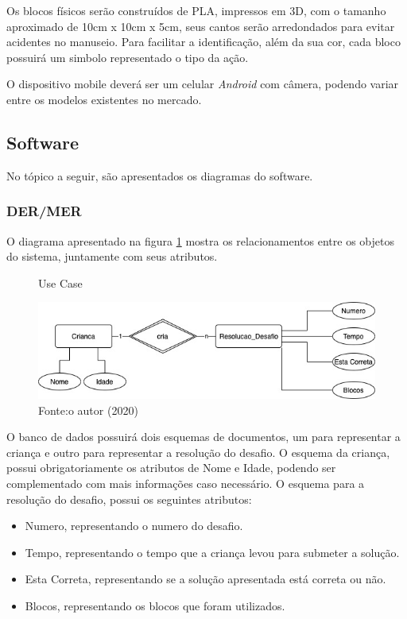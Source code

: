     Os blocos físicos serão construídos de PLA, impressos em 3D, com o tamanho aproximado de 10cm x 10cm x 5cm, seus cantos serão arredondados para evitar acidentes no manuseio. Para facilitar a identificação, além da sua cor, cada bloco possuirá um simbolo representado o tipo da ação.
    
    O dispositivo mobile deverá ser um celular \textit{Android} com câmera, podendo variar entre os modelos existentes no mercado.
    
    \subsection{Software}
     No tópico a seguir, são apresentados os diagramas do software.
        
        \subsubsection{DER/MER}
        O diagrama apresentado na figura \ref{figura:der_mer} mostra os relacionamentos entre os objetos do sistema, juntamente com seus atributos.
        
        \begin{figure}[h!]
            \centering
            \caption{Use Case}
            \includegraphics[width=12cm]{images/cap3/MER_DER.jpg}
            \caption*{Fonte:o autor (2020)}
            \label{figura:der_mer}
        \end{figure}
        
        O banco de dados possuirá dois esquemas de documentos, um para representar a criança e outro para representar a resolução do desafio.
        O esquema da criança, possui obrigatoriamente os atributos de Nome e Idade, podendo ser complementado com mais informações caso necessário.
        O esquema para a resolução do desafio, possui os seguintes atributos:
        
        \begin{itemize}
            \item Numero, representando o numero do desafio.
            \item Tempo, representando o tempo que a criança levou para submeter a solução.
            \item Esta Correta, representando se a solução apresentada está correta ou não.
            \item Blocos, representando os blocos que foram utilizados.
        \end{itemize} 
        
